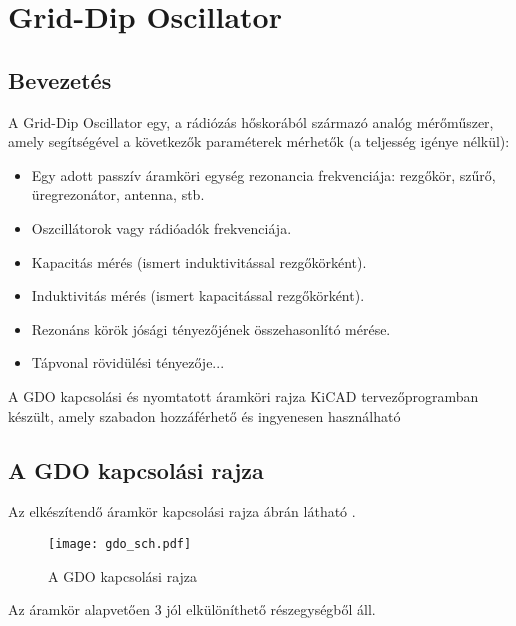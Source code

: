 \chapter{Grid-Dip Oscillator}

\section{Bevezetés}

A Grid-Dip Oscillator egy, a rádiózás hőskorából származó analóg mérőműszer, amely segítségével a következők paraméterek mérhetők (a teljesség igénye nélkül):

\begin{itemize}
\item
Egy adott passzív áramköri egység rezonancia frekvenciája: rezgőkör, szűrő, üregrezonátor, antenna, stb.
\item
Oszcillátorok vagy rádióadók frekvenciája.
\item
Kapacitás mérés (ismert induktivitással rezgőkörként).
\item
Induktivitás mérés (ismert kapacitással rezgőkörként).
\item
Rezonáns körök jósági tényezőjének összehasonlító mérése.
\item
Tápvonal rövidülési tényezője...
\end{itemize}

A GDO kapcsolási és nyomtatott áramköri rajza KiCAD tervezőprogramban készült, amely szabadon hozzáférhető és ingyenesen használható \cite{kicad}

\section{A GDO kapcsolási rajza}

Az elkészítendő áramkör kapcsolási rajza  ábrán látható \cite{radiotechnika}.

\begin{figure}[!ht]
\centering
\texttt{[image: gdo\_sch.pdf]}
\caption{A GDO kapcsolási rajza}
\label{fig:gdoschematic} 
\end{figure}

Az áramkör alapvetően 3 jól elkülöníthető részegységből áll.

